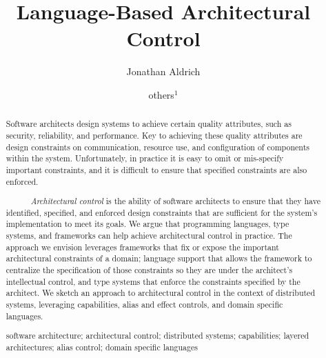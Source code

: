 \documentclass[runningheads]{llncs}
\newcommand{\keywords}[1]{\par\addvspace\baselineskip
\noindent\keywordname\enspace\ignorespaces#1}
\begin{document}
\title{Language-Based Architectural Control}
\author{Jonathan Aldrich \and others$^{1}$}
\setlength{\abovecaptionskip}{0pt}
\setlength{\belowcaptionskip}{0pt}

\maketitle

\begin{sloppypar}
\begin{abstract}
Software architects design systems to achieve certain quality attributes, such as security, reliability, and performance. Key to achieving these quality attributes are design constraints on communication, resource use, and configuration of components within the system. Unfortunately, in practice it is easy to omit or mis-specify important constraints, and it is difficult to ensure that specified constraints are also enforced. 

~~~~~~\emph{Architectural control} is the ability of software architects to ensure that they have identified, specified, and enforced design constraints that are sufficient for the system's implementation to meet its goals. We argue that programming languages, type systems, and frameworks can help achieve architectural control in practice. The approach we envision leverages frameworks that fix or expose the important architectural constraints of a domain; language support that allows the framework to centralize the specification of those constraints so they are under the architect's intellectual control, and type systems that enforce the constraints specified by the architect. We sketch an approach to architectural control in the context of distributed systems, leveraging capabilities, alias and effect controls, and domain specific languages.

\keywords{software architecture;
architectural control;
distributed systems;
capabilities;
layered architectures;
alias control;
domain specific languages}

\end{abstract}


\end{sloppypar}
\end{document}
